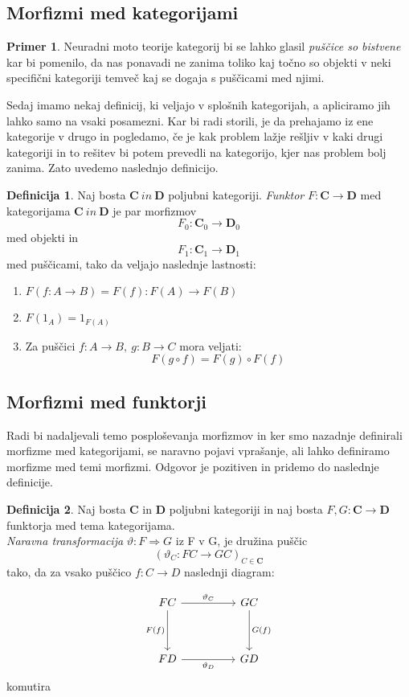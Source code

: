 \documentclass[12pt,a4paper]{book}
\theoremstyle{definition}
\newtheorem{definicija}{Definicija}[chapter]
\theoremstyle{plain}
\theoremstyle{definition}
\newtheorem{primer}{Primer}[section]
\theoremstyle{remark}
\newcommand{\cat}[1]{\textbf{#1}}
\begin{document}
\subsection{Morfizmi med kategorijami}


\begin{primer}
Neuradni moto teorije kategorij bi se lahko glasil \textit{puščice so bistvene}
kar bi pomenilo, da nas ponavadi ne zanima toliko kaj točno so objekti v neki specifični kategoriji temveč kaj se dogaja s puščicami med njimi.
\end{primer}

Sedaj imamo nekaj definicij, ki veljajo v splošnih kategorijah, a apliciramo jih lahko samo na vsaki posamezni. Kar bi radi storili, je da prehajamo iz ene kategorije v drugo in pogledamo, če je kak problem lažje rešljiv v kaki drugi kategoriji in to rešitev bi potem prevedli na kategorijo, kjer nas problem bolj zanima.
Zato uvedemo naslednjo definicijo.
\begin{definicija}
Naj bosta $\cat{C} \ in \ \cat{D}$ poljubni kategoriji. \textit{Funktor} $F : \cat{C} \to \cat{D}$ med kategorijama $\cat{C} \ in \ \cat{D}$ je par morfizmov
$$F_0 : \cat{C}_0 \to \cat{D}_0$$
med objekti in
$$F_1 : \cat{C}_1 \to \cat{D}_1$$
med puščicami, tako da veljajo naslednje lastnosti:
\begin{enumerate}
\item $F(f : A \to B) = F(f) : F(A) \to F(B)$
\item $F(1_A) = 1_{F(A)}$
\item Za puščici $f : A \to B, \ g : B \to C$ mora veljati:
$$F(g \circ f) = F(g) \circ F(f)$$
\end{enumerate}
\end{definicija}

\subsection{Morfizmi med funktorji}
Radi bi nadaljevali temo posploševanja morfizmov in ker smo nazadnje definirali morfizme med kategorijami, se naravno pojavi vprašanje, ali lahko definiramo morfizme med temi morfizmi. Odgovor je pozitiven in pridemo do naslednje definicije.

\begin{definicija}
Naj bosta $\cat{C}$ in $\cat{D}$ poljubni kategoriji in naj bosta $F,G : \cat{C} \to \cat{D}$ funktorja med tema kategorijama. \\
\textit{Naravna transformacija} $\vartheta : F \Rightarrow G$ iz F v G, je družina puščic 
$$(\vartheta_C : FC \to GC)_{C \in \cat{C}}$$
tako, da za vsako puščico $f : C \to D$ naslednji diagram:

\begin{equation}
\begin{tikzcd}[sep=huge]
FC \arrow[r, "\vartheta_C"] \arrow[d, "F(f)"'] & GC \arrow[d, "G(f)"] \\
FD \arrow[r, "\vartheta_D"'] & GD
\end{tikzcd}
\end{equation}
komutira
\end{definicija}
\end{document}
